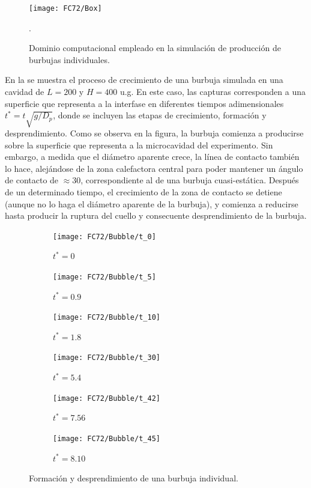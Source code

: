 \begin{figure}[ht]
	\centering
	\texttt{[image: FC72/Box]}
	\caption{Dominio computacional empleado en la simulaci\'on de producci\'on de burbujas individuales.}.
	\label{fig:dominio_hutter}
\end{figure}


En la  se muestra el proceso de crecimiento de una burbuja  simulada en una cavidad de $L=200$ y $H=400$ u.g. En este caso, las capturas corresponden a una superficie que representa a la interfase en diferentes tiempos adimensionales $t^*=t\sqrt{g/D_p}$, donde se incluyen las etapas de crecimiento, formaci\'on y desprendimiento. Como se observa en la figura, la burbuja comienza a producirse sobre la superficie que representa a la microcavidad del experimento. Sin embargo, a medida que el di\'ametro aparente crece, la l\'inea de contacto tambi\'en lo hace, alej\'andose de la zona calefactora central para poder mantener un \'angulo de contacto de $\approx 30$\textordmasculine, correspondiente al de una burbuja cuasi-est\'atica. Despu\'es de un determinado tiempo, el crecimiento de la zona de contacto se detiene (aunque no lo haga el di\'ametro aparente de la burbuja), y comienza a reducirse hasta producir la ruptura del cuello y consecuente desprendimiento de la burbuja. 

\begin{figure}[htb]
    \centering
    \begin{subfigure}[t]{0.45\textwidth}
        \centering
        \texttt{[image: FC72/Bubble/t\_0]}
        \caption{$t^*=0$}
    \end{subfigure}
    \vspace{3mm}
    \begin{subfigure}[t]{0.45\textwidth}
        \centering
        \texttt{[image: FC72/Bubble/t\_5]}
        \caption{$t^*=0.9$}
    \end{subfigure}
    \begin{subfigure}[t]{0.45\textwidth}
        \centering
        \texttt{[image: FC72/Bubble/t\_10]}
        \caption{$t^*=1.8$}
    \end{subfigure}
    \vspace{3mm}    
    \begin{subfigure}[t]{0.45\textwidth}
        \centering
        \texttt{[image: FC72/Bubble/t\_30]}
        \caption{$t^*=5.4$}
    \end{subfigure}
    \begin{subfigure}[t]{0.45\textwidth}
        \centering
        \texttt{[image: FC72/Bubble/t\_42]}
        \caption{$t^*=7.56$}
    \end{subfigure}
    \begin{subfigure}[t]{0.45\textwidth}
        \centering
        \texttt{[image: FC72/Bubble/t\_45]}
        \caption{$t^*=8.10$}
    \end{subfigure}            
    \caption{Formaci\'on y desprendimiento de una burbuja individual.}
    \label{fig:burbuja_nu_11}
\end{figure}
\FloatBarrier

